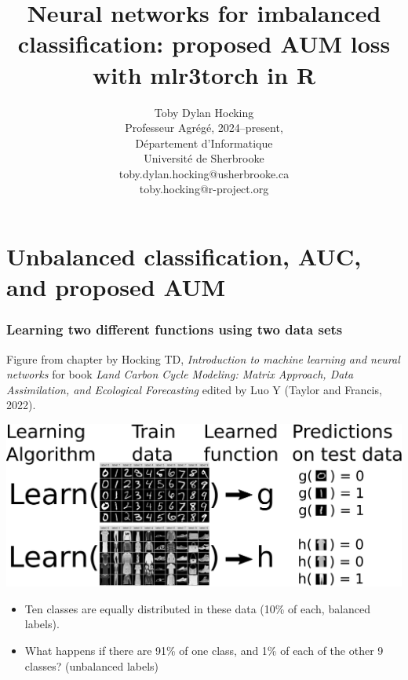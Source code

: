 \documentclass{beamer}
\begin{document}
\title{Neural networks for imbalanced classification: proposed AUM loss with mlr3torch in R}

\author{
  Toby Dylan Hocking\\
  Professeur Agrégé, 2024--present,\\
  Département d'Informatique\\
  Université de Sherbrooke\\
  toby.dylan.hocking@usherbrooke.ca\\
  toby.hocking@r-project.org\\
}

\maketitle

\section{Unbalanced classification, AUC, and proposed AUM}

\begin{frame}
  \frametitle{Learning two different functions using two data sets}
  Figure from chapter by Hocking TD, \textit{Introduction to machine
    learning and neural networks} for book \textit{Land Carbon Cycle
    Modeling: Matrix Approach, Data Assimilation, and Ecological
    Forecasting} edited by Luo Y (Taylor and Francis, 2022).
  \begin{center}
  \includegraphics[width=\textwidth]{drawing-mnist-train-test}
\end{center}
\begin{itemize}
\item Ten classes are equally distributed in these data (10\% of each,
  balanced labels).
\item What happens if there are 91\% of one class, and 1\% of each of
  the other 9 classes? (unbalanced labels)
\end{itemize}
\end{frame}
\end{document}
